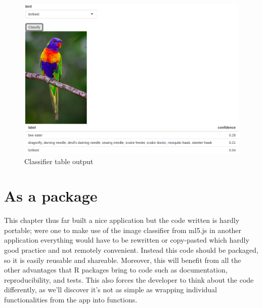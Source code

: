 \documentclass[
]{krantz}
\makeatletter
\newenvironment{Shaded}{\begin{snugshade}}{\end{snugshade}}
\newcommand{\KeywordTok}[1]{\textcolor[rgb]{0.27,0.27,0.27}{\textbf{#1}}}
\newcommand{\NormalTok}[1]{#1}
\newcommand{\OperatorTok}[1]{\textcolor[rgb]{0.43,0.43,0.43}{\textbf{#1}}}
\newcommand{\StringTok}[1]{\textcolor[rgb]{0.5,0.5,0.5}{#1}}
\newenvironment{kframe}{%
\medskip{}
\setlength{\fboxsep}{.8em}
 \def\at@end@of@kframe{}%
 \ifinner\ifhmode%
  \def\at@end@of@kframe{\end{minipage}}%
  \begin{minipage}{\columnwidth}%
 \fi\fi%
 \def\FrameCommand##1{\hskip\@totalleftmargin \hskip-\fboxsep
 \colorbox{shadecolor}{##1}\hskip-\fboxsep
     \hskip-\linewidth \hskip-\@totalleftmargin \hskip\columnwidth}%
 \MakeFramed {\advance\hsize-\width
   \@totalleftmargin\z@ \linewidth\hsize
   \@setminipage}}%
 {\par\unskip\endMakeFramed%
 \at@end@of@kframe}
\renewenvironment{Shaded}{\begin{kframe}}{\end{kframe}}
\makeatother
\begin{document}
\begin{Shaded}
\end{Shaded}

\begin{figure}[t]

{\centering \includegraphics[width=1\linewidth]{images/shiny-complete-table} 

}

\caption{Classifier table output}\label{fig:shiny-complete-table-output}
\end{figure}

\hypertarget{shiny-complete-pkg}{%
\section{As a package}\label{shiny-complete-pkg}}

This chapter thus far built a nice application but the code written is hardly portable; were one to make use of the image classifier from ml5.js in another application everything would have to be rewritten or copy-pasted which hardly good practice and not remotely convenient. Instead this code should be packaged, so it is easily reusable and shareable. Moreover, this will benefit from all the other advantages that R packages bring to code such as documentation, reproducibility, and tests. This also forces the developer to think about the code differently, as we'll discover it's not as simple as wrapping individual functionalities from the app into functions.
\end{document}
